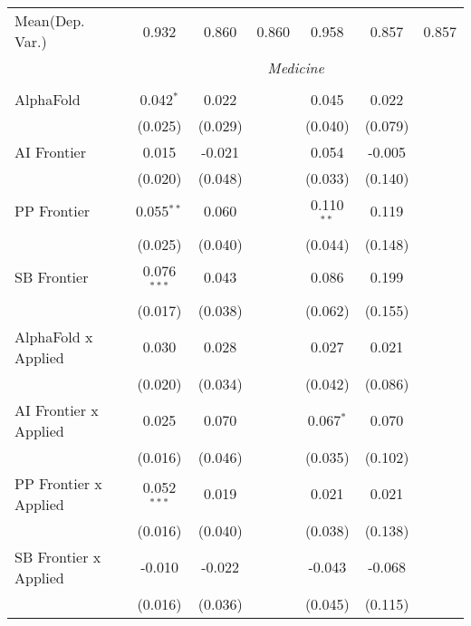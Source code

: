 \begin{tabular}{lcccccc}
Mean(Dep. Var.) & 0.932 & 0.860 & 0.860 & 0.958 & 0.857 & 0.857 \\
 & \multicolumn{6}{c}{\textit{Medicine}} \\ \\
   AlphaFold                      & 0.042$^{*}$   & 0.022   &               & 0.045        & 0.022   &   \\   
                                  & (0.025)       & (0.029) &               & (0.040)      & (0.079) &   \\   
   AI Frontier                    & 0.015         & -0.021  &               & 0.054        & -0.005  &   \\   
                                  & (0.020)       & (0.048) &               & (0.033)      & (0.140) &   \\   
   PP Frontier                    & 0.055$^{**}$  & 0.060   &               & 0.110$^{**}$ & 0.119   &   \\   
                                  & (0.025)       & (0.040) &               & (0.044)      & (0.148) &   \\   
   SB Frontier                    & 0.076$^{***}$ & 0.043   &               & 0.086        & 0.199   &   \\   
                                  & (0.017)       & (0.038) &               & (0.062)      & (0.155) &   \\   
   AlphaFold x Applied            & 0.030         & 0.028   &               & 0.027        & 0.021   &   \\   
                                  & (0.020)       & (0.034) &               & (0.042)      & (0.086) &   \\   
   AI Frontier x Applied          & 0.025         & 0.070   &               & 0.067$^{*}$  & 0.070   &   \\   
                                  & (0.016)       & (0.046) &               & (0.035)      & (0.102) &   \\   
   PP Frontier x Applied          & 0.052$^{***}$ & 0.019   &               & 0.021        & 0.021   &   \\   
                                  & (0.016)       & (0.040) &               & (0.038)      & (0.138) &   \\   
   SB Frontier x Applied          & -0.010        & -0.022  &               & -0.043       & -0.068  &   \\   
                                  & (0.016)       & (0.036) &               & (0.045)      & (0.115) &   \\   

\end{tabular}
